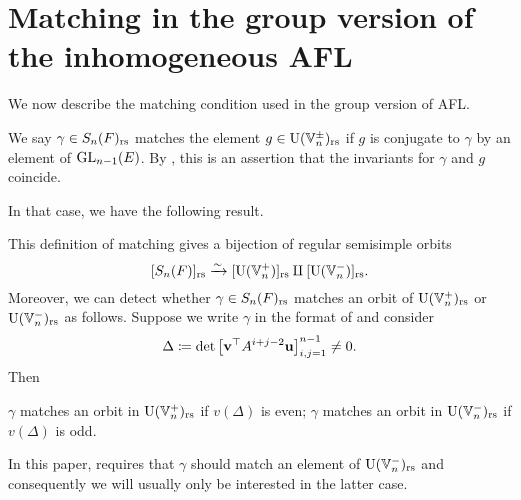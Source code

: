 \section{Matching in the group version of the inhomogeneous AFL}
We now describe the matching condition used in the group version of AFL.
\begin{definition}
  We say $\gamma \in S_n(F)_{\mathrm{rs}}$ matches the element $g \in \operatorname{U}(\mathbb V_n^\pm)_{\mathrm{rs}}$
  if $g$ is conjugate to $\gamma$ by an element of $\operatorname{GL}_{n-1}(E)$.
  By , this is an assertion that
  the invariants for $\gamma$ and $g$ coincide.
  \label{def:matching_inhomog}
\end{definition}
In that case, we have the following result.
\begin{proposition}
  \label{prop:valuation_delta_matching_group}
  This definition of matching gives
  a bijection of regular semisimple orbits
  \[ [S_n(F)]_{\mathrm{rs}} \xrightarrow{\sim} [\operatorname{U}(\mathbb V_n^+)]_{\mathrm{rs}} \amalg [\operatorname{U}(\mathbb V_n^-)]_{\mathrm{rs}}. \]
  Moreover, we can detect whether $\gamma \in S_n(F)_{\mathrm{rs}}$ matches an orbit of
  $\operatorname{U}(\mathbb V_n^+)_{\mathrm{rs}}$ or $\operatorname{U}(\mathbb V_n^-)_{\mathrm{rs}}$ as follows.
  Suppose we write $\gamma$ in the format of  and consider
  \[ \Delta \coloneqq \det \left[ \mathbf v^\top A^{i+j-2} \mathbf u \right]_{i,j=1}^{n-1} \neq 0. \]
  Then
  \begin{itemize}
    \ii $\gamma$ matches an orbit in $\operatorname{U}(\mathbb V_n^+)_{\mathrm{rs}}$ if $v(\Delta)$ is even;
    \ii $\gamma$ matches an orbit in $\operatorname{U}(\mathbb V_n^-)_{\mathrm{rs}}$ if $v(\Delta)$ is odd.
  \end{itemize}
\end{proposition}
In this paper, 
requires that $\gamma$ should match an element of $\operatorname{U}(\mathbb V_n^-)_{\mathrm{rs}}$
and consequently we will usually only be interested in the latter case.


